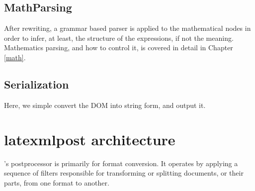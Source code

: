 \documentclass{book}
\begin{document}
\subsection{MathParsing}\label{architecture.mathparsing}
%
After rewriting, a grammar based parser is applied to the mathematical
nodes in order to infer, at least, the structure of the expressions,
if not the meaning.
Mathematics parsing, and how to control it, is covered in detail in Chapter \ref{math}.

\subsection{Serialization}\label{architecture.serialization}
Here, we simple convert the DOM into string form, and output it.

\section{latexmlpost architecture}\label{latexmlpostarchitecture}
%
\LaTeXML's postprocessor is primarily for format conversion.
It operates by applying a sequence of filters responsible for
transforming or splitting documents, or their parts, from one format to another.
\end{document}
